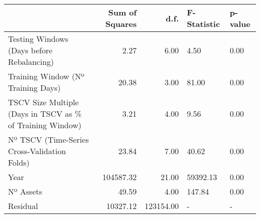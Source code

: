 \begin{tabular}{lrrll}
\toprule
 & Sum of Squares & d.f. & F-Statistic & p-value \\
\midrule
Testing Windows (Days before Rebalancing) & 2.27 & 6.00 & 4.50 & 0.00 \\
Training Window (Nº Training Days) & 20.38 & 3.00 & 81.00 & 0.00 \\
TSCV Size Multiple (Days in TSCV as \% of Training Window) & 3.21 & 4.00 & 9.56 & 0.00 \\
Nº TSCV (Time-Series Cross-Validation Folds) & 23.84 & 7.00 & 40.62 & 0.00 \\
Year & 104587.32 & 21.00 & 59392.13 & 0.00 \\
Nº Assets & 49.59 & 4.00 & 147.84 & 0.00 \\
Residual & 10327.12 & 123154.00 & - & - \\
\bottomrule
\end{tabular}

